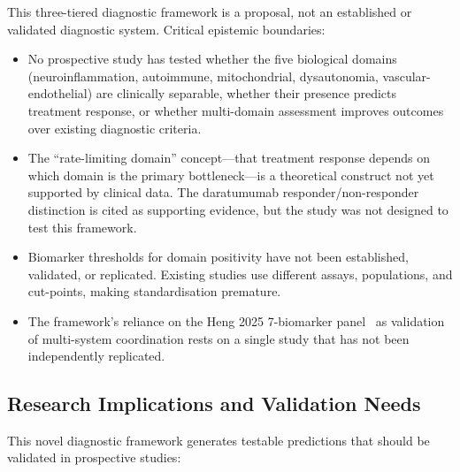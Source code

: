 \begin{limitation}
This three-tiered diagnostic framework is a proposal, not an established or validated diagnostic system. Critical epistemic boundaries:
\begin{itemize}
    \item No prospective study has tested whether the five biological domains (neuroinflammation, autoimmune, mitochondrial, dysautonomia, vascular-endothelial) are clinically separable, whether their presence predicts treatment response, or whether multi-domain assessment improves outcomes over existing diagnostic criteria.
    \item The ``rate-limiting domain'' concept---that treatment response depends on which domain is the primary bottleneck---is a theoretical construct not yet supported by clinical data. The daratumumab responder/non-responder distinction is cited as supporting evidence, but the study was not designed to test this framework.
    \item Biomarker thresholds for domain positivity have not been established, validated, or replicated. Existing studies use different assays, populations, and cut-points, making standardisation premature.
    \item The framework's reliance on the Heng 2025 7-biomarker panel~\cite{heng2025mecfs} as validation of multi-system coordination rests on a single study that has not been independently replicated.
\end{itemize}
\end{limitation}

\subsection{Research Implications and Validation Needs}
\label{subsec:research-implications}

This novel diagnostic framework generates testable predictions that should be validated in prospective studies:

